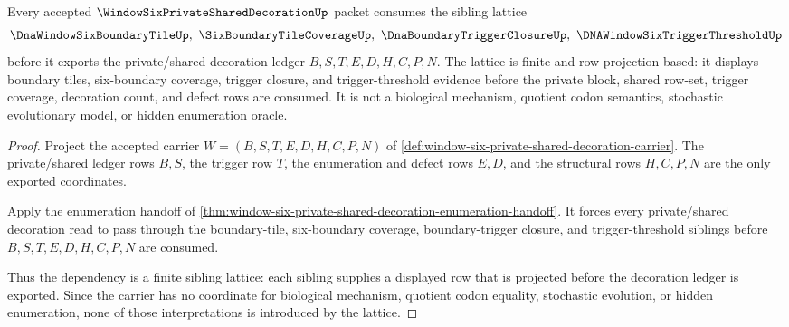 \begin{theorem}\label{thm:window-six-private-shared-decoration-sibling-lattice}
Every accepted $\WindowSixPrivateSharedDecorationUp$ packet consumes the sibling lattice
$$
\DnaWindowSixBoundaryTileUp,\ \SixBoundaryTileCoverageUp,\ \DnaBoundaryTriggerClosureUp,\ \DNAWindowSixTriggerThresholdUp
$$
before it exports the private/shared decoration ledger $B,S,T,E,D,H,C,P,N$. The lattice is finite and row-projection based: it displays boundary tiles, six-boundary coverage, trigger closure, and trigger-threshold evidence before the private block, shared row-set, trigger coverage, decoration count, and defect rows are consumed. It is not a biological mechanism, quotient codon semantics, stochastic evolutionary model, or hidden enumeration oracle.
\end{theorem}
\begin{proof}
Project the accepted carrier $W=(B,S,T,E,D,H,C,P,N)$ of \autoref{def:window-six-private-shared-decoration-carrier}. The private/shared ledger rows $B,S$, the trigger row $T$, the enumeration and defect rows $E,D$, and the structural rows $H,C,P,N$ are the only exported coordinates.

Apply the enumeration handoff of \autoref{thm:window-six-private-shared-decoration-enumeration-handoff}. It forces every private/shared decoration read to pass through the boundary-tile, six-boundary coverage, boundary-trigger closure, and trigger-threshold siblings before $B,S,T,E,D,H,C,P,N$ are consumed.

Thus the dependency is a finite sibling lattice: each sibling supplies a displayed row that is projected before the decoration ledger is exported. Since the carrier has no coordinate for biological mechanism, quotient codon equality, stochastic evolution, or hidden enumeration, none of those interpretations is introduced by the lattice.
\end{proof}



